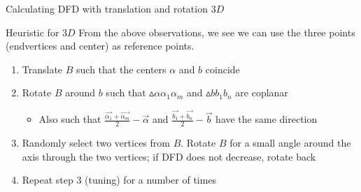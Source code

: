 \documentclass{beamer}
\begin{document}
\begin{frame}{Calculating DFD with translation and rotation $3D$}
  \begin{block}{Heuristic for $3D$}
    From the above observations, we see we can use the three points (endvertices and center) as reference points.
    \begin{enumerate}
      \item Translate $B$ such that the centers $\alpha$ and $b$ coincide
      \item Rotate $B$ around $b$ such that $\vartriangle \alpha\alpha_1\alpha_m$ and $\vartriangle bb_1b_n$ are coplanar
        \begin{itemize}
          \item Also such that $\frac{\vec{\alpha_1}+\vec{\alpha_m}}{2}-\vec{\alpha}$ and $\frac{\vec{b_1}+\vec{b_n}}{2}-\vec{b}$ have the same direction
        \end{itemize}
      \item Randomly select two vertices from $B$. Rotate $B$ for a small angle around the axis through the two vertices; if DFD does not decrease, rotate back
      \item Repeat step $3$ (tuning) for a number of times
    \end{enumerate}
  \end{block}
\end{frame}
\end{document}
